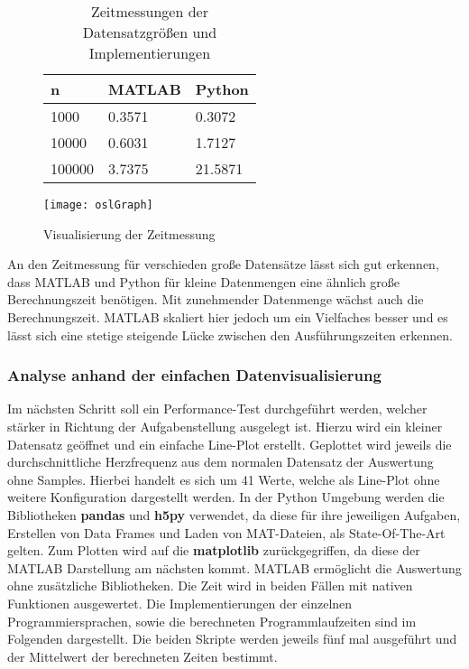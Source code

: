\begin{figure}[H]
	\begin{minipage}[b]{.4\linewidth} %
		\begin{table}[H]
			\begin{tabular}{|l|l|l|}
				\hline
				\textbf{n} & \textbf{MATLAB} & \textbf{Python} \\ \hline
				1000       & 0.3571               & 0.3072               \\ \hline
				10000      & 0.6031               & 1.7127               \\ \hline
				100000     & 3.7375               & 21.5871              \\ \hline
			\end{tabular}
			\caption{Zeitmessungen der Datensatzgrößen und Implementierungen}
		\end{table}
	\end{minipage}
	\hspace{.1\linewidth}%
	\begin{minipage}[b]{.4\linewidth} %
		\texttt{[image: oslGraph]}
		\caption{Visualisierung der Zeitmessung}
	\end{minipage}
\end{figure}

An den Zeitmessung für verschieden große Datensätze lässt sich gut erkennen, dass MATLAB und Python für kleine Datenmengen eine ähnlich große Berechnungszeit benötigen. Mit zunehmender Datenmenge wächst auch die Berechnungszeit. MATLAB skaliert hier jedoch um ein Vielfaches besser und es lässt sich eine stetige steigende Lücke zwischen den Ausführungszeiten erkennen.\cite{olsMatPy}

\subsubsection{Analyse anhand der einfachen Datenvisualisierung}

Im nächsten Schritt soll ein Performance-Test durchgeführt werden, welcher stärker in Richtung der Aufgabenstellung ausgelegt ist. Hierzu wird ein kleiner Datensatz geöffnet und ein einfache Line-Plot erstellt. Geplottet wird jeweils die durchschnittliche Herzfrequenz aus dem normalen Datensatz der Auswertung ohne Samples. Hierbei handelt es sich um 41 Werte, welche als Line-Plot ohne weitere Konfiguration dargestellt werden. In der Python Umgebung werden die Bibliotheken \textbf{pandas} und \textbf{h5py} verwendet, da diese für ihre jeweiligen Aufgaben, Erstellen von Data Frames und Laden von MAT-Dateien, als State-Of-The-Art gelten. Zum Plotten wird auf die \textbf{matplotlib} zurückgegriffen, da diese der MATLAB Darstellung am nächsten kommt. MATLAB ermöglicht die Auswertung ohne zusätzliche Bibliotheken. Die Zeit wird in beiden Fällen mit nativen Funktionen ausgewertet. Die Implementierungen der einzelnen Programmiersprachen, sowie die berechneten Programmlaufzeiten sind im Folgenden dargestellt. Die beiden Skripte werden jeweils fünf mal ausgeführt und der Mittelwert der berechneten Zeiten bestimmt.\cite{pandas}\cite{h5py}

